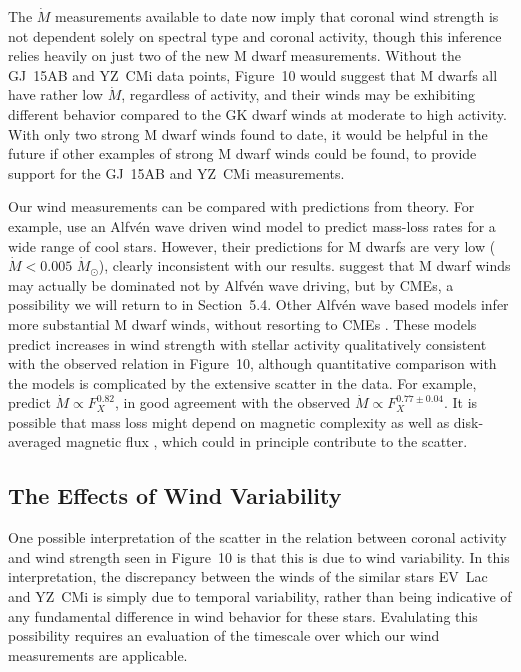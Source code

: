 \documentclass[preprint]{aastex}
\begin{document}
     The $\dot{M}$ measurements available to date now imply
that coronal wind strength is not dependent solely on spectral type and
coronal activity, though this inference relies heavily on just two
of the new M dwarf measurements.
Without the GJ~15AB and YZ~CMi data points, Figure~10 would suggest
that M dwarfs all have rather low $\dot{M}$, regardless of activity,
and their winds may be exhibiting different behavior compared to the
GK dwarf winds at moderate to high activity.  With only two
strong M dwarf winds found to date, it would be helpful in the future
if other examples of strong M dwarf winds could be found, to provide
support for the GJ~15AB and YZ~CMi measurements.

     Our wind measurements can be compared with predictions from
theory.  For example, \citet{src11} use an Alfv\'{e}n wave
driven wind model to predict mass-loss rates for a wide range of cool
stars.  However, their predictions for M dwarfs are
very low ($\dot{M}<0.005$ $\dot{M}_{\odot}$), clearly inconsistent with
our results.  \citet{src11} suggest that M dwarf winds
may actually be dominated not by Alfv\'{e}n wave driving, but by
CMEs, a possibility we will return to in
Section~5.4.  Other Alfv\'{e}n wave based models infer more substantial
M dwarf winds, without resorting to CMEs \citep{aav14,jdag16,alm20}.
These models predict increases in wind
strength with stellar activity qualitatively consistent with the
observed relation in Figure~10, although quantitative comparison with
the models is complicated by the extensive scatter in the data.
For example, \citet{tks13b} predict $\dot{M}\propto F_X^{0.82}$,
in good agreement with the observed $\dot{M}\propto F_X^{0.77\pm 0.04}$.
It is possible that mass loss might depend on magnetic complexity as
well as disk-averaged magnetic flux \citep{cg15},
which could in principle contribute to the scatter.

\subsection{The Effects of Wind Variability}

     One possible interpretation of the scatter in the relation
between coronal activity and wind strength seen in Figure~10 is that
this is due to wind variability.  In this interpretation, the
discrepancy between the winds of the similar stars EV~Lac and YZ~CMi
is simply due to temporal variability, rather than being indicative
of any fundamental difference in wind behavior for these stars.  Evalulating
this possibility requires an evaluation of the timescale over which our
wind measurements are applicable.
\end{document}
